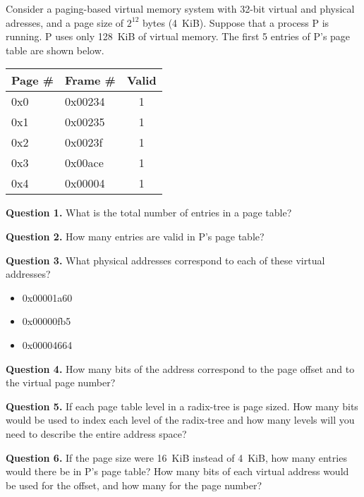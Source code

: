 \documentclass[letterpaper,twocolumn,10pt]{article}
\begin{document}
Consider a paging-based virtual memory system with 32-bit virtual and physical 
adresses, and a page size of $2^{12}$ bytes (4~KiB).  Suppose that a process P 
is running. P uses only 128~KiB of virtual memory.  The first 5 entries of P's 
page table are shown below.

\begin{table}
\centering
\begin{tabular}{l|l|c}
\toprule
Page \# & Frame \# & Valid \\
\midrule
0x0 & 0x00234 & 1\\
    0x1 & 0x00235 & 1\\
    0x2 & 0x0023f & 1\\
    0x3 & 0x00ace & 1\\
    0x4 & 0x00004 & 1\\
\bottomrule
\end{tabular}
\end{table}

\vspace{4em}

\noindent
\textbf{Question 1.} What is the total number of entries in a page table?

\vspace{12em}

\noindent
\textbf{Question 2.} How many entries are valid in P's page table?

\vspace{12em}

\textbf{Question 3.} What physical addresses correspond to each of these 
virtual addresses?

\begin{itemize}
\item 0x00001a60
\item 0x00000fb5
\item 0x00004664
\end{itemize}

\break

\textbf{Question 4.} How many bits of the address correspond to the page offset 
and to the virtual page number?

\vspace{14em}

\textbf{Question 5.} If each page table level in a radix-tree is page sized.  
How many bits would be used to index each level of the radix-tree and how many 
levels will you need to describe the entire address space?

\vspace{14em}

\textbf{Question 6.} If the page size were 16~KiB instead of 4~KiB, how many 
entries would there be in P's page table?  How many bits of each virtual 
address would be used for the offset, and how many for the page number?

\vspace{14em}
\end{document}
